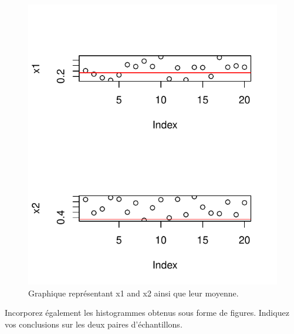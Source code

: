 \begin{figure}[htbp]
	\begin{center}
		\includegraphics[width=12cm]{x1-x2-2.pdf}
		\caption{Graphique représentant x1 and x2 ainsi que leur moyenne.}
		\label{fig:x1-x2-2}
	\end{center}
\end{figure}


Incorporez également les histogrammes obtenus sous forme de figures. Indiquez vos conclusions sur les deux paires d'échantillons. 
